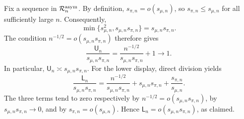 Fix a sequence in \(\mathcal R_n^{\rm asym}\). By definition, \(s_{\pi,n}=o(s_{\mu,n})\), so \(s_{\pi,n}\le s_{\mu,n}\) for all sufficiently large \(n\). Consequently,
\[
\min\{s_{\mu,n}^2,s_{\mu,n}s_{\pi,n}\}=s_{\mu,n}s_{\pi,n}.
\]
The condition \(n^{-1/2}=o(s_{\mu,n}s_{\pi,n})\) therefore gives
\[
\frac{\mathsf U_n}{s_{\mu,n}s_{\pi,n}}
=\frac{n^{-1/2}}{s_{\mu,n}s_{\pi,n}}+1\longrightarrow1.
\]
In particular, \(\mathsf U_n\asymp s_{\mu,n}s_{\pi,n}\). For the lower display, direct division yields
\[
\frac{\mathsf L_n}{s_{\mu,n}s_{\pi,n}}
=\frac{n^{-1/2}}{s_{\mu,n}s_{\pi,n}}
+s_{\mu,n}s_{\pi,n}
+\frac{s_{\pi,n}}{s_{\mu,n}}.
\]
The three terms tend to zero respectively by \(n^{-1/2}=o(s_{\mu,n}s_{\pi,n})\), by \(s_{\mu,n}s_{\pi,n}\to0\), and by \(s_{\pi,n}=o(s_{\mu,n})\). Hence \(\mathsf L_n=o(s_{\mu,n}s_{\pi,n})\), as claimed.